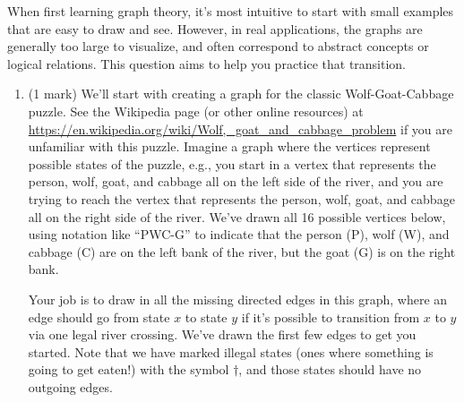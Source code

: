\documentclass[11pt]{article}
\begin{document}
When first learning graph theory, it's most intuitive to start with small
examples that are easy to draw and see.  However, in real applications,
the graphs are generally too large to visualize, and often correspond
to abstract concepts or logical relations.  This question aims to help
you practice that transition.

\begin{enumerate}
\item (1 mark)
We'll start with creating a graph for the classic Wolf-Goat-Cabbage puzzle.
See the Wikipedia page (or other online resources) at
\url{https://en.wikipedia.org/wiki/Wolf,_goat_and_cabbage_problem} if
you are unfamiliar with this puzzle.  Imagine a graph where the
vertices represent possible states of the puzzle, e.g., you start in
a vertex that represents the person, wolf, goat, and cabbage all on the
left side of the river, and you are trying to reach the vertex that
represents the person, wolf, goat, and cabbage all on the right side of
the river.  We've drawn all 16 possible vertices below, using notation
like ``PWC-G'' to indicate that the person (P), wolf (W), and cabbage (C)
are on the left bank of the river, but the goat (G) is on the right bank.
\begin{center}
\footnotesize %
\end{center}
Your job is to draw in all the missing directed edges in this graph, where an
edge should go from state $x$ to state $y$ if it's possible to
transition from $x$ to $y$ via one legal river crossing.  We've
drawn the first few edges to get you started.  Note that we have marked
illegal states (ones where something is going to get eaten!) with
the symbol $\dagger$, and those states should have no outgoing edges.


\end{enumerate}
\end{document}
